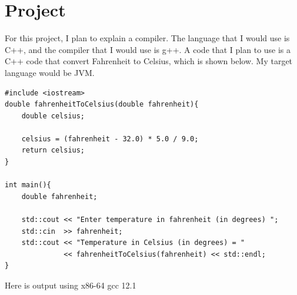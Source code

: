 \documentclass{article}
\theoremstyle{theorem}
\theoremstyle{definition}
\theoremstyle{remark}
\begin{document}
\section{Project}
For this project, I plan to explain a compiler. The language that I would use is C++, and the compiler that I would use is g++. A code that I plan to use is a C++ code that convert Fahrenheit to Celsius, which is shown below. My target language would be JVM.
\begin{lstlisting}
#include <iostream>
double fahrenheitToCelsius(double fahrenheit){
    double celsius;
 
    celsius = (fahrenheit - 32.0) * 5.0 / 9.0;
    return celsius;
}
 
int main(){
    double fahrenheit;
 
    std::cout << "Enter temperature in fahrenheit (in degrees) ";
    std::cin  >> fahrenheit;
    std::cout << "Temperature in Celsius (in degrees) = "
              << fahrenheitToCelsius(fahrenheit) << std::endl;
}
\end{lstlisting}
Here is  output using x86-64 gcc 12.1
\end{document}
